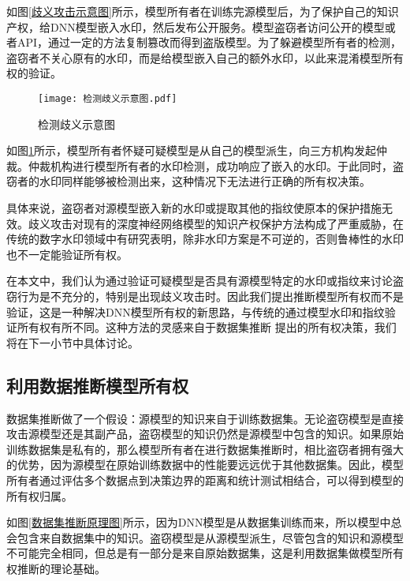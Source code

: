 如图\ref{歧义攻击示意图}所示，模型所有者在训练完源模型后，为了保护自己的知识产权，给DNN模型嵌入水印，然后发布公开服务。模型盗窃者访问公开的模型或者API，通过一定的方法复制篡改而得到盗版模型。为了躲避模型所有者的检测，盗窃者不关心原有的水印，而是给模型嵌入自己的额外水印，以此来混淆模型所有权的验证。

\begin{figure}[htbp]%
	\centering
	\texttt{[image: 检测歧义示意图.pdf]}
	\setlength{\abovecaptionskip}{5mm} %
	\caption{检测歧义示意图}
	\label{检测歧义示意图}
	\end {figure}

如图\ref{检测歧义示意图}所示，模型所有者怀疑可疑模型是从自己的模型派生，向三方机构发起仲裁。仲裁机构进行模型所有者的水印检测，成功响应了嵌入的水印。于此同时，盗窃者的水印同样能够被检测出来，这种情况下无法进行正确的所有权决策。

具体来说，盗窃者对源模型嵌入新的水印或提取其他的指纹使原本的保护措施无效。歧义攻击对现有的深度神经网络模型的知识产权保护方法构成了严重威胁，在传统的数字水印领域中有研究表明，除非水印方案是不可逆的\cite{fan2019rethinking}，否则鲁棒性的水印也不一定能验证所有权。

在本文中，我们认为通过验证可疑模型是否具有源模型特定的水印或指纹来讨论盗窃行为是不充分的，特别是出现歧义攻击时。因此我们提出推断模型所有权而不是验证，这是一种解决DNN模型所有权的新思路，与传统的通过模型水印和指纹验证所有权有所不同。这种方法的灵感来自于数据集推断\cite{maini2021dataset} 提出的所有权决策，我们将在下一小节中具体讨论。

\subsection{利用数据推断模型所有权}\label{4.1.2}

数据集推断做了一个假设：源模型的知识来自于训练数据集。无论盗窃模型是直接攻击源模型还是其副产品，盗窃模型的知识仍然是源模型中包含的知识。如果原始训练数据集是私有的，那么模型所有者在进行数据集推断时，相比盗窃者拥有强大的优势，因为源模型在原始训练数据中的性能要远远优于其他数据集。因此，模型所有者通过评估多个数据点到决策边界的距离和统计测试相结合，可以得到模型的所有权归属。

如图\ref{数据集推断原理图}所示，因为DNN模型是从数据集训练而来，所以模型中总会包含来自数据集中的知识。盗窃模型是从源模型派生，尽管包含的知识和源模型不可能完全相同，但总是有一部分是来自原始数据集，这是利用数据集做模型所有权推断的理论基础。

